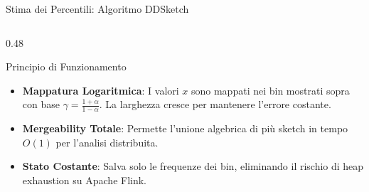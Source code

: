 \documentclass[10pt, aspectratio=169]{beamer}
\begin{document}
\begin{frame}[fragile]{Stima dei Percentili: Algoritmo DDSketch}
    \vspace{-0.9cm}
    \begin{columns}[t]
        \begin{column}{0.48\textwidth}
            \begin{block}{Principio di Funzionamento{}}
                \footnotesize
                \begin{itemize}
                    \item \textbf{Mappatura Logaritmica}: I valori $x$ sono mappati nei bin mostrati sopra con base $\gamma = \frac{1 + \alpha}{1 - \alpha}$. La larghezza cresce per mantenere l'errore costante.
                    \item \textbf{Mergeability Totale}: Permette l'unione algebrica di più sketch in tempo $O(1)$ per l'analisi distribuita.
                    \item \textbf{Stato Costante}: Salva solo le frequenze dei bin, eliminando il rischio di heap exhaustion su Apache Flink.
                \end{itemize}
            \end{block}
        \end{column}


\end{columns}
\end{frame}
\end{document}

